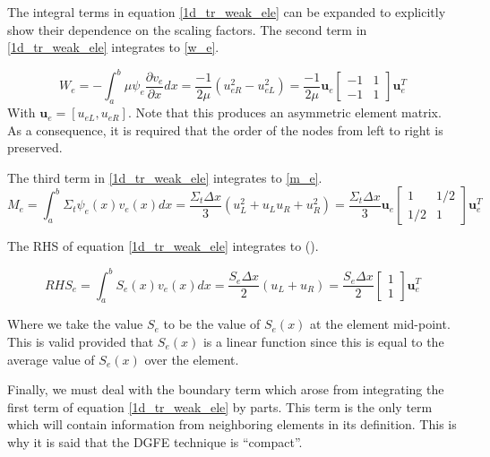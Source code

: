 The integral terms in equation \ref{1d_tr_weak_ele} can be expanded to explicitly show their dependence on the scaling factors.  The second term in \ref{1d_tr_weak_ele} integrates to \ref{w_e}.

\begin{equation}
W_e = -\int_a^b \mu \psi_e \frac{\partial v_e}{\partial x} dx = \frac{-1}{2\mu}(u_{eR}^2 - u_{eL}^2) = 
\frac{-1}{2\mu} \mathbf u_e 
\begin{bmatrix}
    -1      & 1 \\
    -1       & 1 
\end{bmatrix}
\mathbf u_e^T
\label{w_e}
\end{equation}
With $\mathbf u_e = [u_{eL}, u_{eR}]$.  Note that this produces an asymmetric element matrix.  As a consequence, it is required that the order of the nodes from left to right is preserved.

The third term in \ref{1d_tr_weak_ele} integrates to \ref{m_e}.
\begin{equation}
M_e = \int_a^b \Sigma_t \psi_e(x)v_e(x) dx =
\frac{\Sigma_t \Delta x}{3} (u_L^2 + u_L u_R + u_R^2) = 
\frac{\Sigma_t \Delta x}{3} \mathbf u_e 
\begin{bmatrix}
    1      & 1/2 \\
    1/2      & 1 
\end{bmatrix}
\mathbf u_e^T
\label{m_e}
\end{equation}

The RHS of equation \ref{1d_tr_weak_ele} integrates to ().

\begin{equation}
RHS_e = \int_a^b S_e(x)v_e(x) dx =
\frac{S_e \Delta x}{2} (u_L + u_R) = 
\frac{S_e \Delta x}{2}
\begin{bmatrix}
    1     \\
    1 
\end{bmatrix}
\mathbf u_e^T
\label{s_e}
\end{equation}

Where we take the value $S_e$ to be the value of $S_e(x)$ at the element mid-point.  This is valid provided that $S_e(x)$ is a linear function since this is equal to the average value of $S_e(x)$ over the element.

Finally, we must deal with the boundary term which arose from integrating the first term of equation \ref{1d_tr_weak_ele} by parts.  This term is the only term which will contain information from neighboring elements in its definition.  This is why it is said that the DGFE technique is ``compact''. 

